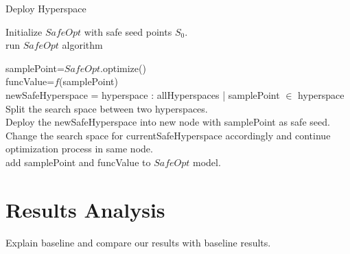 \begin{algorithm}
	\SetAlgoVlined
	\caption{Deploy Hyperspace}
	Initialize $SafeOpt$ with safe seed points $S_0$.\\
	{
		{
			run $SafeOpt$ algorithm
		}
		\KwRet{}
	}
	{
		samplePoint=$SafeOpt$.optimize()\\
		funcValue=$f$(samplePoint)\\
		newSafeHyperspace = hyperspace : allHyperspaces | samplePoint $\in$ hyperspace\\
		{
			Split the search space between two hyperspaces.\\
			Deploy the newSafeHyperspace into new node with samplePoint as safe seed.\\
			Change the search space for currentSafeHyperspace accordingly and continue optimization process in same node.\\
		}
		{
			add samplePoint and funcValue to $SafeOpt$ model.
		}
		
	}
\end{algorithm}

\section{Results Analysis}
Explain baseline and compare our results with baseline results.